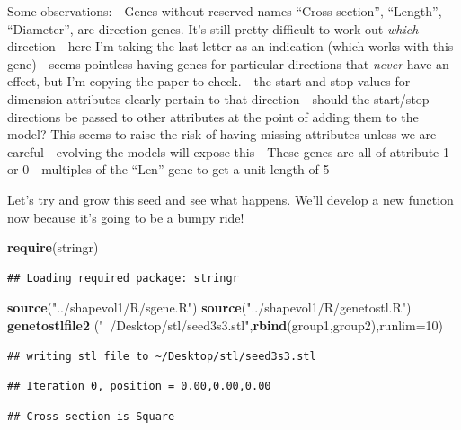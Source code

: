 \documentclass[]{article}
\newenvironment{Shaded}{\begin{snugshade}}{\end{snugshade}}
\newcommand{\DataTypeTok}[1]{\textcolor[rgb]{0.13,0.29,0.53}{#1}}
\newcommand{\DecValTok}[1]{\textcolor[rgb]{0.00,0.00,0.81}{#1}}
\newcommand{\KeywordTok}[1]{\textcolor[rgb]{0.13,0.29,0.53}{\textbf{#1}}}
\newcommand{\NormalTok}[1]{#1}
\newcommand{\StringTok}[1]{\textcolor[rgb]{0.31,0.60,0.02}{#1}}
\begin{document}
Some observations: - Genes without reserved names ``Cross section'',
``Length'', ``Diameter'', are direction genes. It's still pretty
difficult to work out \emph{which} direction - here I'm taking the last
letter as an indication (which works with this gene) - seems pointless
having genes for particular directions that \emph{never} have an effect,
but I'm copying the paper to check. - the start and stop values for
dimension attributes clearly pertain to that direction - should the
start/stop directions be passed to other attributes at the point of
adding them to the model? This seems to raise the risk of having missing
attributes unless we are careful - evolving the models will expose this
- These genes are all of attribute 1 or 0 - multiples of the ``Len''
gene to get a unit length of 5

Let's try and grow this seed and see what happens. We'll develop a new
function now because it's going to be a bumpy ride!

\begin{Shaded}
\begin{Highlighting}[]
\KeywordTok{require}\NormalTok{(stringr)}
\end{Highlighting}
\end{Shaded}

\begin{verbatim}
## Loading required package: stringr
\end{verbatim}

\begin{Shaded}
\begin{Highlighting}[]
\KeywordTok{source}\NormalTok{(}\StringTok{"../shapevol1/R/sgene.R"}\NormalTok{)}
\KeywordTok{source}\NormalTok{(}\StringTok{"../shapevol1/R/genetostl.R"}\NormalTok{)}
\KeywordTok{genetostlfile2}\NormalTok{   (}\StringTok{"~/Desktop/stl/seed3s3.stl"}\NormalTok{,}\KeywordTok{rbind}\NormalTok{(group1,group2),}\DataTypeTok{runlim=}\DecValTok{10}\NormalTok{)}
\end{Highlighting}
\end{Shaded}

\begin{verbatim}
## writing stl file to ~/Desktop/stl/seed3s3.stl
\end{verbatim}

\begin{verbatim}
## Iteration 0, position = 0.00,0.00,0.00
\end{verbatim}

\begin{verbatim}
## Cross section is Square
\end{verbatim}
\end{document}
